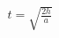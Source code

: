 \documentclass[preview]{standalone}
\begin{document}
\begin{align*}
t = \sqrt{\frac{2h}{a}}
\end{align*}
\end{document}
